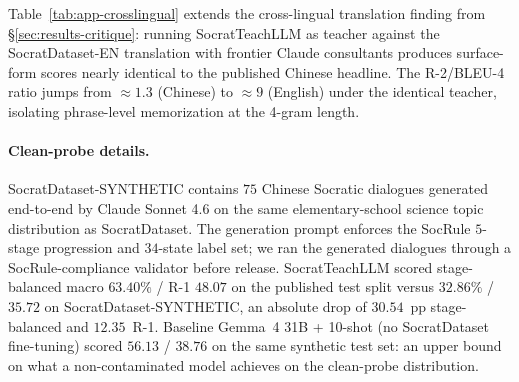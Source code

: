 \documentclass[11pt]{article}
\begin{document}
Table~\ref{tab:app-crosslingual} extends the cross-lingual translation finding from \S\ref{sec:results-critique}: running SocratTeachLLM as teacher against the SocratDataset-EN translation with frontier Claude consultants produces surface-form scores nearly identical to the published Chinese headline. The R-2/BLEU-4 ratio jumps from $\approx 1.3$ (Chinese) to $\approx 9$ (English) under the identical teacher, isolating phrase-level memorization at the 4-gram length.

\begin{table}[h]
  \centering
  \small
  \caption{Cross-lingual translation experiment. Sonnet + SocratTeachLLM on SocratDataset-EN reproduces the published headline of R-1 $=57.40$, R-2 $=33.63$ within $1.55$ R-1 points and $0.16$ R-2 points; the R-2/B-4 ratio simultaneously inflates to $\approx 9$, isolating the loss of Chinese 4-gram fingerprints under translation.}
  \label{tab:app-crosslingual}
\end{table}

\paragraph{Clean-probe details.} SocratDataset-SYNTHETIC contains $75$ Chinese Socratic dialogues generated end-to-end by Claude Sonnet 4.6 on the same elementary-school science topic distribution as SocratDataset. The generation prompt enforces the SocRule $5$-stage progression and $34$-state label set; we ran the generated dialogues through a SocRule-compliance validator before release. SocratTeachLLM scored stage-balanced macro $63.40\%$ / R-1 $48.07$ on the published test split versus $32.86\%$ / $35.72$ on SocratDataset-SYNTHETIC, an absolute drop of $30.54$~pp stage-balanced and $12.35$~R-1. Baseline Gemma~4 31B + 10-shot (no SocratDataset fine-tuning) scored $56.13$ / $38.76$ on the same synthetic test set: an upper bound on what a non-contaminated model achieves on the clean-probe distribution.
\end{document}

